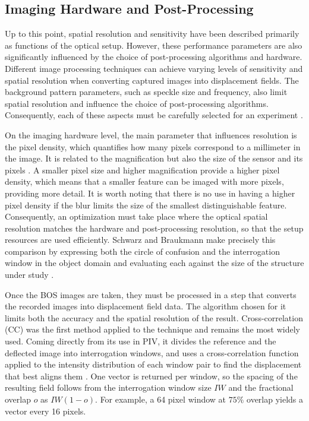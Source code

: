 \subsection{Imaging Hardware and Post-Processing}
\label{subsection: Image processing}

\par Up to this point, spatial resolution and sensitivity have been described primarily as functions of the optical setup. However, these performance parameters are also significantly influenced by the choice of post-processing algorithms and hardware. Different image processing techniques can achieve varying levels of sensitivity and spatial resolution when converting captured images into displacement fields. The background pattern parameters, such as speckle size and frequency, also limit spatial resolution and influence the choice of post-processing algorithms. Consequently, each of these aspects must be carefully selected for an experiment \cite{Schmidt2025}.

\par On the imaging hardware level, the main parameter that influences resolution is the pixel density, which quantifies how many pixels correspond to a millimeter in the image. It is related to the magnification but also the size of the sensor and its pixels \cite{Schmidt2025, Gojani&Obayashi}. A smaller pixel size and higher magnification provide a higher pixel density, which means that a smaller feature can be imaged with more pixels, providing more detail. It is worth noting that there is no use in having a higher pixel density if the blur limits the size of the smallest distinguishable feature. Consequently, an optimization must take place where the optical spatial resolution matches the hardware and post-processing resolution, so that the setup resources are used efficiently. Schwarz and Braukmann make precisely this comparison by expressing both the circle of confusion and the interrogation window in the object domain and evaluating each against the size of the structure under study \cite{Schwarz&Braukmann}.

\par Once the BOS images are taken, they must be processed in a step that converts the recorded images into displacement field data. The algorithm chosen for it limits both the accuracy and the spatial resolution of the result. Cross-correlation (CC) was the first method applied to the technique \cite{Raffel2001} and remains the most widely used. Coming directly from its use in PIV, it divides the reference and the deflected image into interrogation windows, and uses a cross-correlation function applied to the intensity distribution of each window pair to find the displacement that best aligns them \cite{Schmidt2025}. One vector is returned per window, so the spacing of the resulting field follows from the interrogation window size $IW$ and the fractional overlap $o$ as $IW(1-o)$. For example, a 64 pixel window at $75\%$ overlap yields a vector every 16 pixels.

